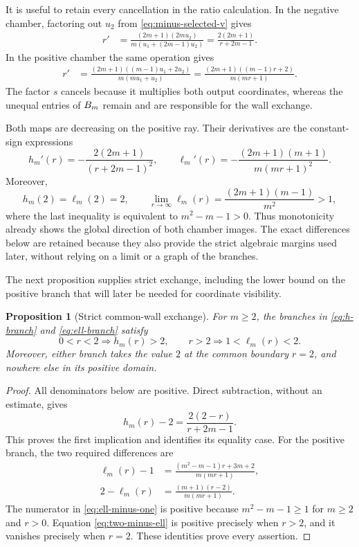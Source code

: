 \documentclass[11pt]{article}
\newtheorem{proposition}[theorem]{Proposition}
\theoremstyle{definition}
\theoremstyle{remark}
\begin{document}
It is useful to retain every cancellation in the ratio calculation.  In the
negative chamber, factoring out \(u_2\) from
\eqref{eq:minus-selected-v} gives
\begin{align*}
r'
&=\frac{(2m+1)(2mu_2)}
        {m(u_1+(2m-1)u_2)}
=\frac{2(2m+1)}{r+2m-1}.
\end{align*}
In the positive chamber the same operation gives
\begin{align*}
r'
&=\frac{(2m+1)((m-1)u_1+2u_2)}
        {m(mu_1+u_2)}
=\frac{(2m+1)((m-1)r+2)}{m(mr+1)}.
\end{align*}
The factor \(s\) cancels because it multiplies both output coordinates,
whereas the unequal entries of \(B_m\) remain and are responsible for the
wall exchange.

Both maps are decreasing on the positive ray.  Their derivatives are the
constant-sign expressions
\begin{equation}
h_m'(r)=-\frac{2(2m+1)}{(r+2m-1)^2},
\qquad
\ell_m'(r)=-\frac{(2m+1)(m+1)}{m(mr+1)^2}.
\label{eq:branch-derivatives}
\end{equation}
Moreover,
\[
h_m(2)=\ell_m(2)=2,
\qquad
\lim_{r\to\infty}\ell_m(r)
=\frac{(2m+1)(m-1)}{m^2}>1,
\]
where the last inequality is equivalent to
\(m^2-m-1>0\).  Thus monotonicity already shows the global direction of
both chamber images.  The exact differences below are retained because they
also provide the strict algebraic margins used later, without relying on a
limit or a graph of the branches.

The next proposition supplies strict exchange, including the lower bound on
the positive branch that will later be needed for coordinate visibility.

\begin{proposition}[Strict common-wall exchange]
\label{prop:strict-exchange}
For \(m\geq2\), the branches in \eqref{eq:h-branch} and
\eqref{eq:ell-branch} satisfy
\[
0<r<2\Longrightarrow h_m(r)>2,
\qquad
r>2\Longrightarrow 1<\ell_m(r)<2.
\]
Moreover, either branch takes the value \(2\) at the common boundary
\(r=2\), and nowhere else in its positive domain.
\end{proposition}

\begin{proof}
All denominators below are positive.  Direct subtraction, without an
estimate, gives
\begin{equation}
h_m(r)-2=\frac{2(2-r)}{r+2m-1}.
\label{eq:h-minus-two}
\end{equation}
This proves the first implication and identifies its equality case.  For the
positive branch, the two required differences are
\begin{align}
\ell_m(r)-1
&=\frac{(m^2-m-1)r+3m+2}{m(mr+1)},
\label{eq:ell-minus-one}\\
2-\ell_m(r)
&=\frac{(m+1)(r-2)}{m(mr+1)}.
\label{eq:two-minus-ell}
\end{align}
The numerator in \eqref{eq:ell-minus-one} is positive because
\(m^2-m-1\geq1\) for \(m\geq2\) and \(r>0\).  Equation
\eqref{eq:two-minus-ell} is positive precisely when \(r>2\), and it vanishes
precisely when \(r=2\).  These identities prove every assertion.
\end{proof}
\end{document}
